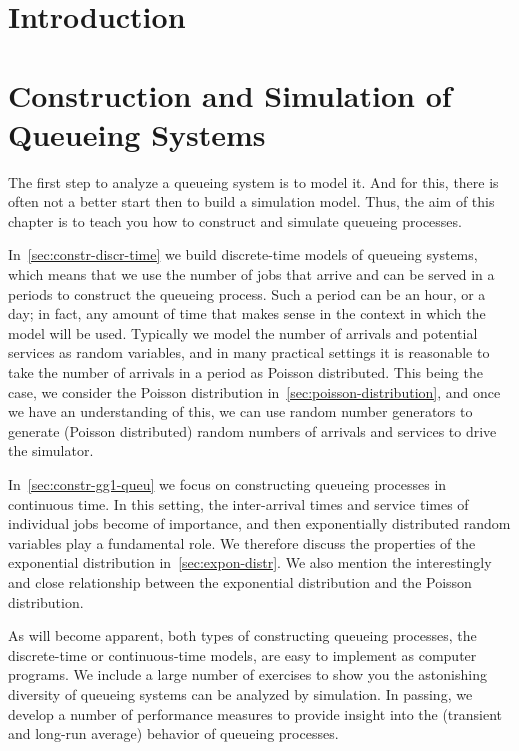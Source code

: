 \chapter{Introduction}
\label{cha:introduction}


\clearpage



\mainmatter

\chapter{Construction and Simulation of Queueing Systems}
\label{cha:single-stat-queu}


The first step to analyze a queueing system is to model it.
And for this, there is often not a better start then to build a simulation model.
Thus, the aim of this chapter is to teach you how to construct and simulate queueing processes.

In~\cref{sec:constr-discr-time} we build discrete-time models of queueing systems, which means that we use the number of jobs that arrive and can be served in a periods to construct the queueing process.
Such a period can be an hour, or a day; in fact, any amount of time that makes sense in the context in which the model will be used.
Typically we model the number of arrivals and potential services as random variables, and in many practical settings it is reasonable to take the number of arrivals in a period as Poisson distributed.
This being the case, we consider the Poisson distribution in~\cref{sec:poisson-distribution}, and once we have an understanding of this, we can use random number generators to generate (Poisson distributed) random numbers of arrivals and services to drive the simulator.


In~\cref{sec:constr-gg1-queu} we focus on constructing queueing processes in continuous time.
In this setting, the inter-arrival times and service times of individual jobs become of importance, and then exponentially distributed random variables play a fundamental role.
We therefore discuss the properties of the exponential distribution in~\cref{sec:expon-distr}.
We also mention the interestingly and close relationship between the exponential distribution and the Poisson distribution.

As will become apparent, both types of constructing queueing processes, the discrete-time or continuous-time models, are easy to implement as computer programs.
We include a large number of exercises to show you the astonishing diversity of queueing systems can be analyzed by simulation.
In passing, we develop a number of performance measures to provide insight into the (transient and long-run average) behavior of queueing processes.

